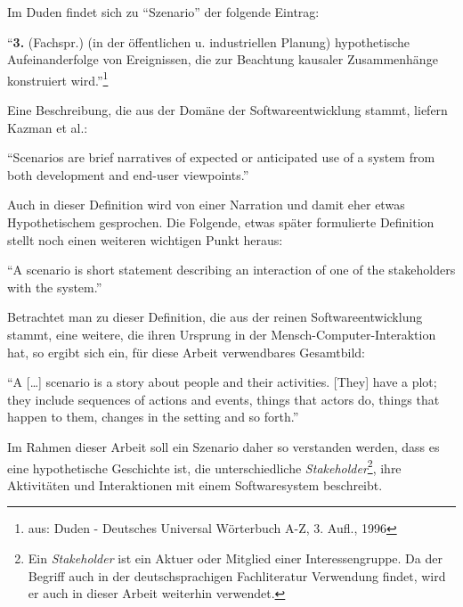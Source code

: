   Im Duden findet sich zu "`Szenario"' der folgende Eintrag:
  
  \begin{definition}\label{def:szenario_allg}
    "`\textbf{3.} (Fachspr.) (in der öffentlichen u. industriellen Planung) hypothetische Aufeinanderfolge von Ereignissen, die zur Beachtung kausaler Zusammenhänge konstruiert wird."'\footnote{aus: Duden - Deutsches Universal Wörterbuch A-Z, 3. Aufl., 1996}
  \end{definition}
  
  Eine Beschreibung, die aus der Domäne der Softwareentwicklung stammt, liefern Kazman et al.:
  
  \begin{definition}\label{def:szenario_kazman_et_al}
    "`Scenarios are brief narratives of expected or anticipated use of a system from both development and end-user viewpoints."'~\emph{\citep[S. 2]{scenario_based_analysis_of_software_architecture}}
  \end{definition}
  
  Auch in dieser Definition wird von einer Narration und damit eher etwas Hypothetischem gesprochen. Die Folgende, etwas später formulierte Definition stellt noch einen weiteren wichtigen Punkt heraus:
  
  \begin{definition}\label{def:szenario_clements_et_al}
    "`A scenario is short statement describing an interaction of one of the stakeholders with the system."'~\emph{\citep[S. 33]{evaluating_software_architectures}}
  \end{definition}
  
  Betrachtet man zu dieser Definition, die aus der reinen Softwareentwicklung stammt, eine weitere, die ihren Ursprung in der Mensch-Computer-Interaktion hat, so ergibt sich ein, für diese Arbeit verwendbares Gesamtbild:
  
  \begin{definition}\label{def:szenario_carroll_rosson}
    "`A [\ldots] scenario is a story about people and their activities. [They] have a plot; they include sequences of actions and events, things that actors do, things that happen to them, changes in the setting and so forth."'~\emph{\citep[S. 16/18]{scenario_based_development}}
  \end{definition}
  
  Im Rahmen dieser Arbeit soll ein Szenario daher so verstanden werden, dass es eine hypothetische Geschichte ist, die unterschiedliche \emph{Stakeholder}\footnote{Ein \emph{Stakeholder} ist ein Aktuer oder Mitglied einer Interessengruppe. Da der Begriff auch in der deutschsprachigen Fachliteratur Verwendung findet, wird er auch in dieser Arbeit weiterhin verwendet.}, ihre Aktivitäten und Interaktionen mit einem Softwaresystem beschreibt.
  
